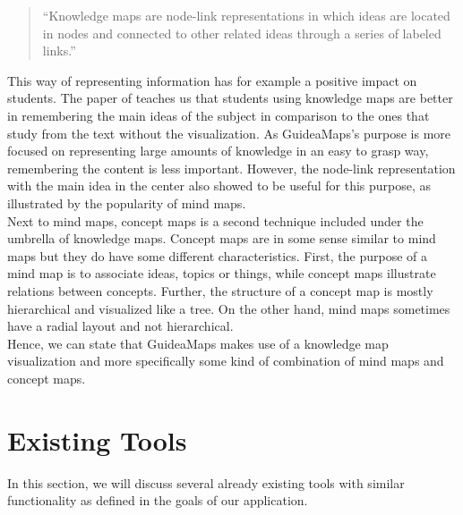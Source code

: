 \begin{quote}
``Knowledge maps are node-link representations in which ideas are located in nodes and connected to other related ideas through a series of labeled links.'' \hfill 
\end{quote}

This way of representing information has for example a positive impact on students. The paper of \cite{knowledgemapsodonnell} teaches us that students using knowledge maps are better in remembering the main ideas of the subject in comparison to the ones that study from the text without the visualization. As GuideaMaps's purpose is more focused on representing large amounts of knowledge in an easy to grasp way, remembering the content is less important. However, the node-link representation with the main idea in the center also showed to be useful for this purpose, as illustrated by the popularity of mind maps.\\

Next to mind maps, concept maps is a second technique included under the umbrella of knowledge maps. Concept maps are in some sense similar to mind maps but they do have some different characteristics. First, the purpose of a mind map is to associate ideas, topics or things, while concept maps illustrate relations between concepts. Further, the structure of a concept map is mostly hierarchical and visualized like a tree. On the other hand, mind maps sometimes have a radial layout and not hierarchical. \citep{davies} \\

Hence, we can state that GuideaMaps makes use of a knowledge map visualization and more specifically some kind of combination of mind maps and concept maps.



\section{Existing Tools}\label{sec:existing-tools}
In this section, we will discuss several already existing tools with similar functionality as defined in the goals of our application.

